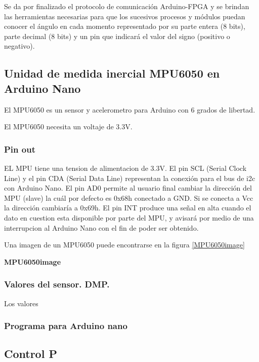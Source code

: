 Se da por finalizado el protocolo de comunicación Arduino-FPGA y se brindan las herramientas necesarias para que los sucesivos procesos y módulos puedan conocer el ángulo en cada momento representado por su parte entera (8 bits), parte decimal (8 bits) y un pin que indicará el valor del signo (positivo o negativo).

\subsection{Unidad de medida inercial MPU6050 en Arduino Nano}\label{sec:MPU6050}

El MPU6050 es un sensor y acelerometro para Arduino con 6 grados de libertad. 

El MPU6050 necesita un voltaje de 3.3V. 

\subsubsection{Pin out}

EL MPU tiene una tension de alimentacion de 3.3V. El pin SCL (Serial Clock Line) y el pin CDA (Serial Data Line) representan la conexión para el bus de i2c con Arduino Nano. El pin AD0 permite al usuario final cambiar la dirección del MPU (slave) la cuál por defecto es 0x68h conectado a GND. Si se conecta a Vcc la dirección cambiaría a 0x69h. El pin INT produce una señal en alta cuando el dato en cuestion esta disponible por parte del MPU, y avisará por medio de una interrupcion al Arduino Nano con el fin de poder ser obtenido. \newline

Una imagen de un MPU6050 puede encontrarse en la figura \ref{MPU6050image}

\textbf{MPU6050image}

\subsubsection{Valores del sensor. DMP. }

Los valores 

\subsubsection{Programa para Arduino nano}



\subsection{Control P}
